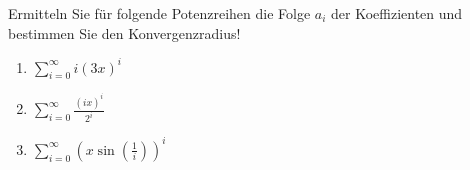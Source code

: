 \item Ermitteln Sie für folgende Potenzreihen die Folge $a_i$ der Koeffizienten und bestimmen Sie den Konvergenzradius!

\begin{multicols}{3}
\begin{enumerate}
\item $\sum\limits_{i=0}^\infty i(3x)^i$
\item $\sum\limits_{i=0}^\infty \frac{(ix)^i}{2^i}$
\item $\sum\limits_{i=0}^\infty \left(x\sin(\frac{1}{i})\right)^i$
\end{enumerate}
\end{multicols}

